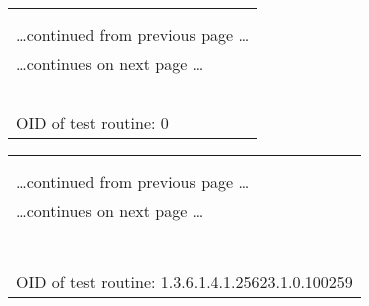 \documentclass{article}
\begin{document}
\begin{longtable}{|p{}|}
\hline
\rowcolor{openvas_log}{\color{white}{Log}}\\
\rowcolor{openvas_log}{\color{white}{NVT: }}\\
\hline
\endfirsthead
\hfill\ldots continued from previous page \ldots \\
\hline
\endhead
\hline
\ldots continues on next page \ldots \\
\endfoot
\hline
\endlastfoot
\\
\rowcolor{white}{\verb=Open port.=}\\
\rowcolor{white}{\verb==}\\
\rowcolor{white}{\verb==}\\
\\
OID of test routine: 0\\
\end{longtable}

\begin{longtable}{|p{}|}
\hline
\rowcolor{openvas_log}{\color{white}{Log (CVSS: 0.0) }}\\
\rowcolor{openvas_log}{\color{white}{NVT: SSH Protocol Versions Supported}}\\
\hline
\endfirsthead
\hfill\ldots continued from previous page \ldots \\
\hline
\endhead
\hline
\ldots continues on next page \ldots \\
\endfoot
\hline
\endlastfoot
\\
\rowcolor{white}{\verb=The remote SSH Server supports the following SSH Protocol Versions:=}\\
\rowcolor{white}{\verb=1.99=}\\
\rowcolor{white}{\verb=2.0=}\\
\rowcolor{white}{\verb==}\\
\rowcolor{white}{\verb==}\\
\\
OID of test routine: 1.3.6.1.4.1.25623.1.0.100259\\
\end{longtable}
\end{document}
